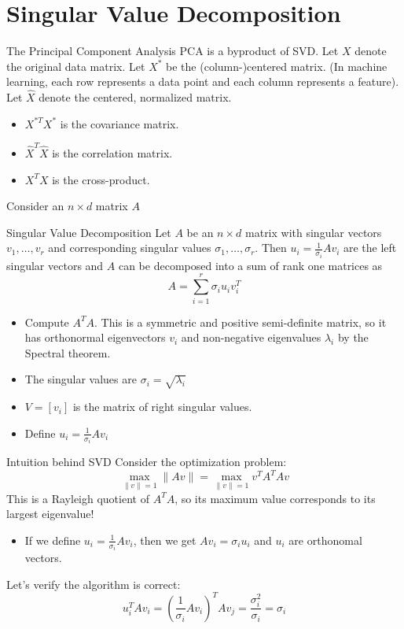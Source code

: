 \documentclass[../main]{subfiles}
\begin{document}
\section{Singular Value Decomposition}
The Principal Component Analysis PCA is a byproduct of SVD. Let $X$ denote the original data matrix. Let $X^*$ be the (column-)centered matrix. (In machine learning, each row represents a data point and each column represents a feature). Let $\hat X$ denote the centered, normalized matrix.
\begin{itemize}
    \item $X^{*T}X^*$ is the covariance matrix.
    \item $\hat X^T \hat X$ is the correlation matrix.
    \item $X^T X$ is the cross-product.
\end{itemize}
Consider an $n\times d$ matrix $A$
\begin{bbox}{Singular Value Decomposition}
    Let $A$ be an $n\times d$ matrix with singular vectors $v_1,\dots, v_r$ and corresponding singular values $\sigma_1,\dots, \sigma_r$. Then $u_i = \frac{1}{\sigma_i} Av_i$ are the left singular vectors and $A$ can be decomposed into a sum of rank one matrices as 
    \[
    A = \sum_{i=1}^r \sigma_i u_i v_i^T
    \]
    \begin{itemize}
        \item Compute $A^T A$. This is a symmetric and positive semi-definite matrix, so it has orthonormal eigenvectors $v_i$ and non-negative eigenvalues $\lambda_i$ by the Spectral theorem.
        \item The singular values are $\sigma_i = \sqrt{\lambda_i}$
        \item $V = [v_i]$ is the matrix of right singular values.
        \item Define $u_i = \frac{1}{\sigma_i}Av_i$
    \end{itemize}
\end{bbox}
\begin{pbox}{Intuition behind SVD}
    Consider the optimization problem:
    \[
    \max_{\|v\|=1} \|Av\| = \max_{\|v\|=1} v^T A^T Av
    \]
    This is a Rayleigh quotient of $A^T A$, so its maximum value corresponds to its largest eigenvalue!
    \begin{itemize}
        \item If we define $u_i = \frac{1}{\sigma_i}Av_i$, then we get $Av_i = \sigma_i u_i$ and $u_i$ are orthonomal vectors.
    \end{itemize}
    Let's verify the algorithm is correct:
    \[
    u_i^T A v_i = (\frac{1}{\sigma_i} Av_i)^TAv_j = \frac{\sigma_i^2}{\sigma_i} = \sigma_i
    \]
\end{pbox}
\end{document}
